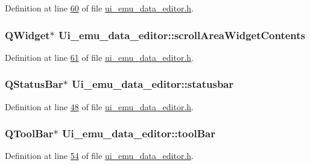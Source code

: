 Definition at line \hyperlink{a00138_source_l00060}{60} of file \hyperlink{a00138_source}{ui\+\_\+emu\+\_\+data\+\_\+editor.\+h}.

\hypertarget{a00079_a2fd25ae1a2b71980cbe9b9ba2751da3b}{
\subsubsection[{scroll\+Area\+Widget\+Contents}]{\setlength{\rightskip}{0pt plus 5cm}Q\+Widget$\ast$ Ui\+\_\+emu\+\_\+data\+\_\+editor\+::scroll\+Area\+Widget\+Contents}}\label{a00079_a2fd25ae1a2b71980cbe9b9ba2751da3b}


Definition at line \hyperlink{a00138_source_l00061}{61} of file \hyperlink{a00138_source}{ui\+\_\+emu\+\_\+data\+\_\+editor.\+h}.

\hypertarget{a00079_ab06a6e9bb964fc017cb9a246ee1f9ecb}{
\subsubsection[{statusbar}]{\setlength{\rightskip}{0pt plus 5cm}Q\+Status\+Bar$\ast$ Ui\+\_\+emu\+\_\+data\+\_\+editor\+::statusbar}}\label{a00079_ab06a6e9bb964fc017cb9a246ee1f9ecb}


Definition at line \hyperlink{a00138_source_l00048}{48} of file \hyperlink{a00138_source}{ui\+\_\+emu\+\_\+data\+\_\+editor.\+h}.

\hypertarget{a00079_a884ecf47fc47f20bd60e9406b1ef88f1}{
\subsubsection[{tool\+Bar}]{\setlength{\rightskip}{0pt plus 5cm}Q\+Tool\+Bar$\ast$ Ui\+\_\+emu\+\_\+data\+\_\+editor\+::tool\+Bar}}\label{a00079_a884ecf47fc47f20bd60e9406b1ef88f1}


Definition at line \hyperlink{a00138_source_l00054}{54} of file \hyperlink{a00138_source}{ui\+\_\+emu\+\_\+data\+\_\+editor.\+h}.

